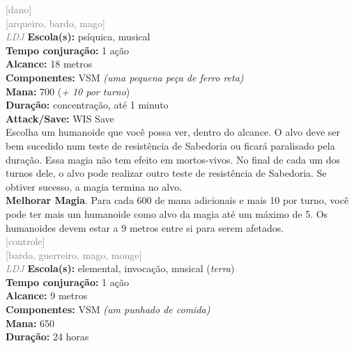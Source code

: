 \documentclass{RPG_Adventure}[2021/10/20]
\begin{document}
{\scriptsize \textcolor{gray}{[dano]\\}}
{\scriptsize \textcolor{gray}{[arqueiro, bardo, mago]\\}}
{\tiny \textcolor{gray}{\textit{LDJ}}}\jump{}
{\small \t \textbf{Escola(s):} psíquica, musical\\\t \textbf{Tempo conjuração:} 1 ação\\\t \textbf{Alcance:} 18 metros\\\t \textbf{Componentes:} VSM \textit{(uma pequena peça de ferro reta)}\\\t \textbf{Mana:} 700 (\textit{+ 10 por turno})\\\t \textbf{Duração:} concentração, até 1 minuto\\\t \textbf{Attack/Save:} WIS Save\\}
{\normalsize Escolha um humanoide que você possa ver, dentro do alcance. O alvo deve ser bem sucedido num teste de resistência de Sabedoria ou ficará paralisado pela duração. Essa magia não tem efeito em mortos-vivos. No final de cada um dos turnos dele, o alvo pode realizar outro teste de resistência de Sabedoria. Se obtiver sucesso, a magia termina no alvo.\\\t \textbf{Melhorar Magia}. Para cada 600 de mana adicionais e mais 10 por turno, você pode ter mais um humanoide como alvo da magia até um máximo de 5. Os humanoides devem estar a 9 metros entre si para serem afetados.\\}
{\scriptsize \textcolor{gray}{[controle]\\}}
{\scriptsize \textcolor{gray}{[bardo, guerreiro, mago, monge]\\}}
{\tiny \textcolor{gray}{\textit{LDJ}}}\jump{}
{\small \t \textbf{Escola(s):} elemental, invocação, musical (\textit{terra})\\\t \textbf{Tempo conjuração:} 1 ação\\\t \textbf{Alcance:} 9 metros\\\t \textbf{Componentes:} VSM \textit{(um punhado de comida)}\\\t \textbf{Mana:} 650\\\t \textbf{Duração:} 24 horas\\}
\end{document}
